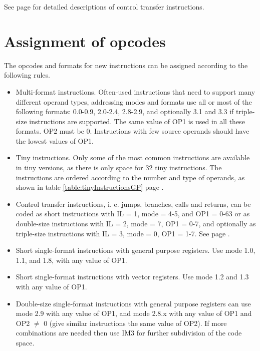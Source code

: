 \documentclass[forwardcom.tex]{subfiles}
\begin{document}
See page \pageref{descriptionOfControlTransferInstructions} for 
detailed descriptions of control transfer instructions.


\section{Assignment of opcodes}
The opcodes and formats for new instructions can be assigned according to the following rules.

\begin{itemize}
\item Multi-format instructions. Often-used instructions that need to support many different operand types, addressing modes and formats use all or most of the following formats: 0.0-0.9, 2.0-2.4, 2.8-2.9, and optionally 3.1 and 3.3 if triple-size instructions are supported. The same value of OP1 is used in all these formats. OP2 must be 0. Instructions with few source operands should have the lowest values of OP1.

\item Tiny instructions. Only some of the most common instructions are available in tiny versions, as there is only space for 32 tiny instructions. The instructions are ordered according to the number and type of operands, as shown in table \ref{table:tinyInstructionsGP} page \pageref{table:tinyInstructionsGP}.

\item Control transfer instructions, i. e. jumps, branches, calls and returns, can be coded as short instructions with IL = 1, mode = 4-5, and OP1 = 0-63 or as double-size instructions with IL = 2, mode = 7, OP1 = 0-7, and optionally as triple-size instructions with IL = 3, mode = 0, OP1 = 1-7. See page \pageref{table:jumpInstructionFormats}.

\item Short single-format instructions with general purpose registers. Use mode 1.0, 1.1, and 1.8, with  any value of OP1.

\item Short single-format instructions with vector registers. Use mode 1.2 and 1.3
with any value of OP1.

\item Double-size single-format instructions with general purpose registers can use mode 2.9 with any value of OP1, and mode 2.8.x with any value of OP1 and OP2 $\neq$ 0 (give similar instructions the same value of OP2). If more combinations are needed then use IM3 for further subdivision of the code space.


\end{itemize}
\end{document}
